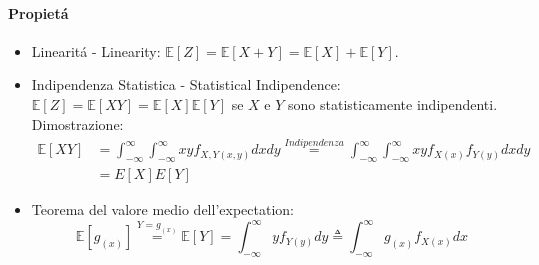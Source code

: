             \paragraph{Propietá}
                \begin{itemize}
                    \item {\label{linearita expectation} Linearitá - Linearity: $\mathbb{E}[Z] = \mathbb{E}[X+Y]  = \mathbb{E}[X] +\mathbb{E}[Y]$.}
                    \item {\label{Indipendenza statistica}Indipendenza Statistica - Statistical Indipendence:$\mathbb{E}[Z] = \mathbb{E}[XY] = \mathbb{E}[X] \mathbb{E}[Y]$ 
                    se $X$ e $Y$ sono statisticamente indipendenti.\\
                    Dimostrazione:
                    \begin{align}
                        \mathbb{E}[XY] &= \int_{-\infty}^{\infty}\int_{-\infty}^{\infty} xy f_{X,Y (x,y)} dxdy \overset{Indipendenza}{=} \int_{-\infty}^{\infty}\int_{-\infty}^{\infty} xy f_{X (x)}f_{Y (y)} dxdy \nonumber \\
                                       &= E[X]E[Y] \nonumber
                    \end{align}
                    }
                    \item {\label{valor medio expectation} Teorema del valore medio dell'expectation: 
                        \[
                            \mathbb{E}[g_{(x)}] \overset{Y=g_{(x)}}{=} \mathbb{E}[Y] =  \int_{-\infty}^{\infty}yf_{Y(y)}dy \triangleq \int_{-\infty}^{\infty}g_{(x)}f_{X(x)}dx
                        \]
                    }
                \end{itemize}
